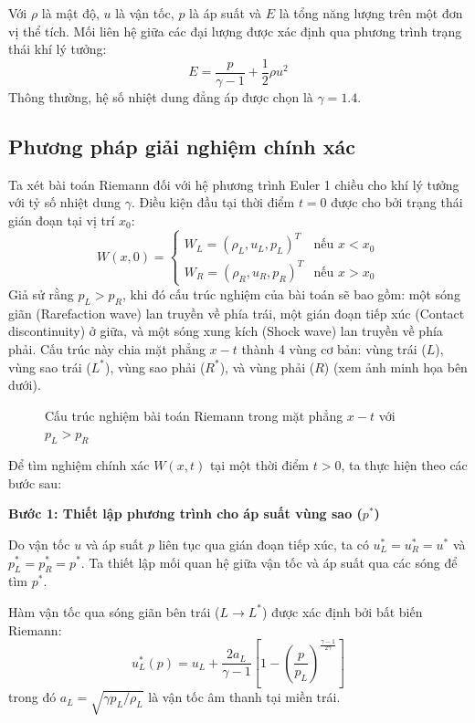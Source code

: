 Với $\rho$ là mật độ, $u$ là vận tốc, $p$ là áp suất và $E$ là tổng năng lượng trên một đơn vị thể tích. Mối liên hệ giữa các đại lượng được xác định qua phương trình trạng thái khí lý tưởng:
\begin{equation*}
E = \frac{p}{\gamma - 1} + \frac{1}{2}\rho u^2
\end{equation*}
Thông thường, hệ số nhiệt dung đẳng áp được chọn là $\gamma = 1.4$.


\subsection{Phương pháp giải nghiệm chính xác}

Ta xét bài toán Riemann đối với hệ phương trình Euler 1 chiều cho khí lý tưởng với tỷ số nhiệt dung $\gamma$. Điều kiện đầu tại thời điểm $t=0$ được cho bởi trạng thái gián đoạn tại vị trí $x_0$:
\begin{equation*}
    W(x, 0) = \begin{cases} 
    W_L = (\rho_L, u_L, p_L)^T & \text{nếu } x < x_0 \\
    W_R = (\rho_R, u_R, p_R)^T & \text{nếu } x > x_0
    \end{cases}
\end{equation*}
Giả sử rằng $p_L > p_R$, khi đó cấu trúc nghiệm của bài toán sẽ bao gồm: một sóng giãn (Rarefaction wave) lan truyền về phía trái, một gián đoạn tiếp xúc (Contact discontinuity) ở giữa, và một sóng xung kích (Shock wave) lan truyền về phía phải. Cấu trúc này chia mặt phẳng $x-t$ thành 4 vùng cơ bản: vùng trái ($L$), vùng sao trái ($L^*$), vùng sao phải ($R^*$), và vùng phải ($R$) (xem ảnh minh họa bên dưới).

\begin{figure}[H]
\centering

\caption{Cấu trúc nghiệm bài toán Riemann trong mặt phẳng $x-t$ với $p_L > p_R$}
\label{fig:riemann_structure}
\end{figure}

Để tìm nghiệm chính xác $W(x,t)$ tại một thời điểm $t > 0$, ta thực hiện theo các bước sau:

\textbf{Bước 1: Thiết lập phương trình cho áp suất vùng sao ($p^*$)}

Do vận tốc $u$ và áp suất $p$ liên tục qua gián đoạn tiếp xúc, ta có $u_L^* = u_R^* = u^*$ và $p_L^* = p_R^* = p^*$. Ta thiết lập mối quan hệ giữa vận tốc và áp suất qua các sóng để tìm $p^*$.

Hàm vận tốc qua sóng giãn bên trái ($L \to L^*$) được xác định bởi bất biến Riemann:
\begin{equation*}
    u_L^*(p) = u_L + \frac{2a_L}{\gamma-1}\left[ 1 - \left( \frac{p}{p_L} \right)^{\frac{\gamma-1}{2\gamma}} \right]
\end{equation*}
trong đó $a_L = \sqrt{\gamma p_L / \rho_L}$ là vận tốc âm thanh tại miền trái.

